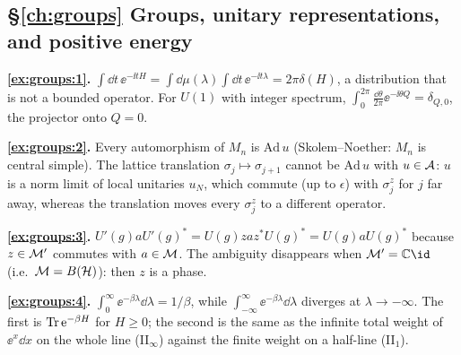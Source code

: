 {\subsection*{\S\ref{ch:groups} Groups, unitary representations, and positive energy}
\textbf{\ref{ex:groups:1}.} $\int\dd t\,\ee^{-\ii tH}=\int\dd\mu(\lambda)\int\dd t\,\ee^{-\ii t\lambda}=2\pi\delta(H)$, a distribution that is not a bounded operator. For $U(1)$ with integer spectrum, $\int_0^{2\pi}\frac{\dd\theta}{2\pi}\ee^{-\ii\theta Q}=\delta_{Q,0}$, the projector onto $Q=0$.\par
\textbf{\ref{ex:groups:2}.} Every automorphism of $M_n$ is $\mathrm{Ad}\,u$ (Skolem--Noether: $M_n$ is central simple). The lattice translation $\sigma_j\mapsto\sigma_{j+1}$ cannot be $\mathrm{Ad}\,u$ with $u\in\mathcal{A}$: $u$ is a norm limit of local unitaries $u_N$, which commute (up to $\epsilon$) with $\sigma^z_j$ for $j$ far away, whereas the translation moves every $\sigma^z_j$ to a different operator.\par
\textbf{\ref{ex:groups:3}.} $U'(g)aU'(g)^*=U(g)zaz^*U(g)^*=U(g)aU(g)^*$ because $z\in\mathcal{M}'$ commutes with $a\in\mathcal{M}$. The ambiguity disappears when $\M'=\C\id$ (i.e.\ $\mathcal{M}=B(\mathcal{H})$): then $z$ is a phase.\par
\textbf{\ref{ex:groups:4}.} $\int_0^\infty\ee^{-\beta\lambda}\dd\lambda=1/\beta$, while $\int_{-\infty}^\infty\ee^{-\beta\lambda}\dd\lambda$ diverges at $\lambda\to-\infty$. The first is $\operatorname{Tr}\mathrm{e}^{-\beta H}$ for $H\ge0$; the second is the same as the infinite total weight of $\ee^x\dd x$ on the whole line (II$_\infty$) against the finite weight on a half-line (II$_1$).\par

}
